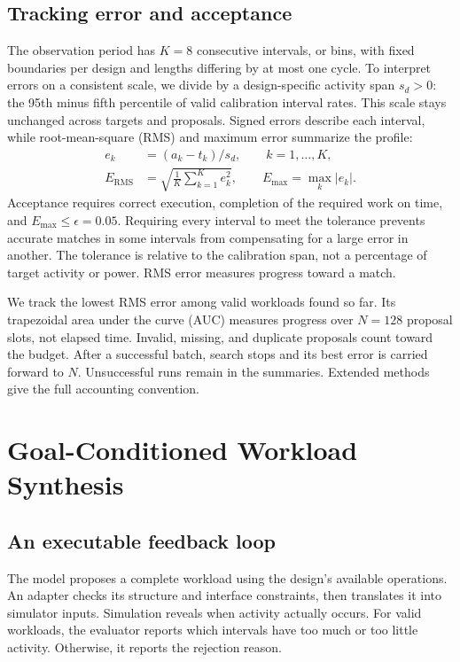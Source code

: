 \documentclass[conference]{IEEEtran}
\begin{document}
\subsection{Tracking error and acceptance}
The observation period has $K=8$ consecutive intervals, or bins, with fixed
boundaries per design and lengths differing by at most one cycle. To interpret
errors on a consistent scale, we divide by a design-specific activity span
$s_d>0$: the 95th minus fifth percentile of valid calibration interval rates.
This scale stays unchanged across targets and proposals.
Signed errors describe each interval, while root-mean-square (RMS) and maximum error summarize
the profile:
\begin{equation}
 \begin{aligned}
 e_k &= (a_k-t_k)/s_d,\qquad k=1,\ldots,K,\\
 E_{\mathrm{RMS}} &= \sqrt{\frac{1}{K}\sum_{k=1}^{K}e_k^2},\qquad
 E_{\max}=\max_k|e_k|.
 \end{aligned}
 \label{eq:loss}
\end{equation}
Acceptance requires correct execution, completion of the required work on
time, and $E_{\max}\leq\epsilon=0.05$. Requiring every interval to meet the
tolerance prevents accurate matches in some intervals from compensating for
a large error in another. The tolerance is relative to the calibration span,
not a percentage of target activity or power. RMS error measures progress
toward a match.

We track the lowest RMS error among valid workloads found so far. Its
trapezoidal area under the curve (AUC) measures progress over $N=128$ proposal
slots, not elapsed time. Invalid, missing,
and duplicate proposals count toward the budget. After a successful batch,
search stops and its best error is carried forward to $N$. Unsuccessful runs
remain in the summaries. Extended methods give the full accounting convention.

\section{Goal-Conditioned Workload Synthesis}
\subsection{An executable feedback loop}
The model proposes a complete workload using the design's available operations.
An adapter checks its structure and interface constraints, then translates it
into simulator inputs. Simulation reveals when activity actually occurs.
For valid workloads, the evaluator reports which intervals have too much or
too little activity. Otherwise, it reports the rejection reason.
\end{document}
